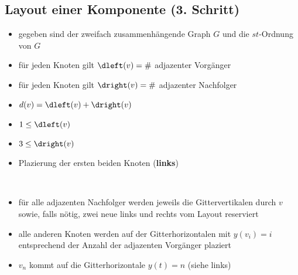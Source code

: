 \subsection{Layout einer Komponente (3. Schritt)}
\begin{itemize}[itemsep=-1pt]
	\item gegeben sind der zweifach zusammenhängende Graph $G$ und die $st$-Ordnung von $G$
	\item für jeden Knoten gilt $\dleft(v)=\#$ adjazenter Vorgänger
	\item für jeden Knoten gilt $\dright(v)=\#$ adjazenter Nachfolger
\end{itemize}
\begin{minipage}{0.4\textwidth}
	
\end{minipage}
\begin{minipage}{0.55\textwidth}
	\begin{itemize}[itemsep=-1pt]
		\item $d(v)=\dleft(v)+\dright(v)$
		\item $1\leq \dleft(v)$
		\item $3\leq \dright(v)$
		\item Plazierung der ersten beiden Knoten (\textbf{links})
	\end{itemize}
\end{minipage}\\
\begin{minipage}{2cm}
\end{minipage}
\begin{minipage}{0.35\textwidth}
	
\end{minipage}
\begin{minipage}{0.6\textwidth}
	\begin{itemize}[itemsep=-1pt]
		\item für alle adjazenten Nachfolger werden jeweils die Gittervertikalen durch $v$ sowie, falls nötig, zwei neue links und rechts vom Layout reserviert
		\item alle anderen Knoten werden auf der Gitterhorizontalen mit $y(v_i)=i$ entsprechend der Anzahl der adjazenten Vorgänger plaziert
		\item $v_n$ kommt auf die Gitterhorizontale $y(t)=n$ (siehe links)
	\end{itemize}
\end{minipage}\\
